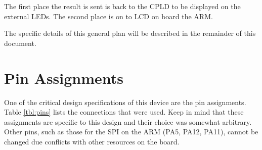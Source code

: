 \documentclass{article}
\begin{document}
The first place the result is sent is back to the CPLD to be
displayed on the external LEDs.
The second place is on to LCD on board the ARM.

The specific details of this general plan will be described 
in the remainder of this document.



\section{Pin Assignments}

One of the critical design specifications of this device are
the pin assignments.
Table \ref{tbl:pins} lists the connections that were used.
Keep in mind that these assignments are specific to this
design and their choice was somewhat arbitrary.
Other pins, such as those for the SPI on the ARM (PA5, PA12, PA11),
cannot be changed due conflicts with other resources on the board.
\end{document}
